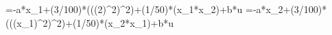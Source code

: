 =-a*x_1+(3/100)*(((2)^2)^2)+(1/50)*(x_1*x_2)+b*u
=-a*x_2+(3/100)*(((x_1)^2)^2)+(1/50)*(x_2*x_1)+b*u
